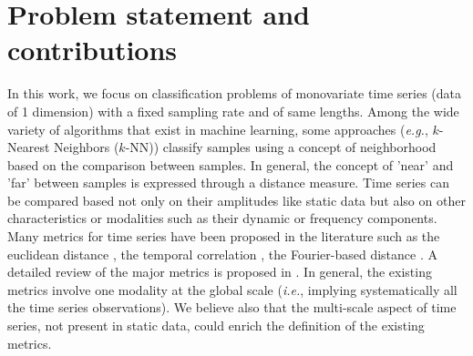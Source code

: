 \section*{Problem statement and contributions}
In this work, we focus on classification problems of monovariate time series (data of 1 dimension) with a fixed sampling rate and of same lengths. Among the wide variety of algorithms that exist in machine learning, some approaches (\textit{e.g.}, $k$-Nearest Neighbors ($k$-NN)) classify samples using a concept of neighborhood based on the comparison between samples. In general, the concept of 'near' and 'far' between samples is expressed through a distance measure. Time series can be compared based not only on their amplitudes like static data but also on other characteristics or modalities such as their dynamic or frequency components. Many metrics for time series have been proposed in the literature such as the euclidean distance \cite{Ding2008}, the temporal correlation \cite{Frambourg2013}, the Fourier-based distance \cite{Sahidullah2012a}. A detailed review of the major metrics is proposed in \cite{Montero2014}. In general, the existing metrics involve one modality at the global scale (\textit{i.e.}, implying systematically all the time series observations). We believe also that the multi-scale aspect of time series, not present in static data, could enrich the definition of the existing metrics. 

